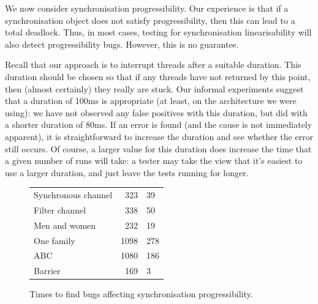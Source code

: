 
We now consider synchronisation progressibility.  Our experience is that if a
synchronisation object does not satisfy progressibility, then this can lead to
a total deadlock.  Thus, in most cases, testing for synchronisation
linearisability will also detect progressibility bugs.  However, this is no
guarantee.    



Recall that our approach is to interrupt threads after a suitable duration.
This duration should be chosen so that if any threads have not returned by
this point, then (almost certainly) they really are stuck.  Our informal
experiments suggest that a duration of 100ms is appropriate (at least, on the
architecture we were using): we have not observed any false positives with
this duration, but did with a shorter duration of 80ms.  If an error is found
(and the cause is not immediately apparent), it is straightforward to increase
the duration and see whether the error still occurs.  Of course, a larger
value for this duration does increase the time that a given number of runs
will take: a tester may take the view that it's easiest to use a larger
duration, and just leave the tests running for longer.


\begin{figure}
\begin{center}
\begin{tabular}{lr@{$\,\pm\,$}l}
Synchronous channel  &	323	 & 39 \\
Filter channel  &	338	 & 50 \\
Men and women  	&       232	 & 19 \\
One family  	&      1098	 & 278 \\
ABC  	&              1080	 & 186 \\
Barrier  	&       169	 & 3
\end{tabular}
\end{center}
\caption{Times to find bugs affecting synchronisation progressibility.}
\label{fig:progressBugFindingExperiment}
\end{figure}


